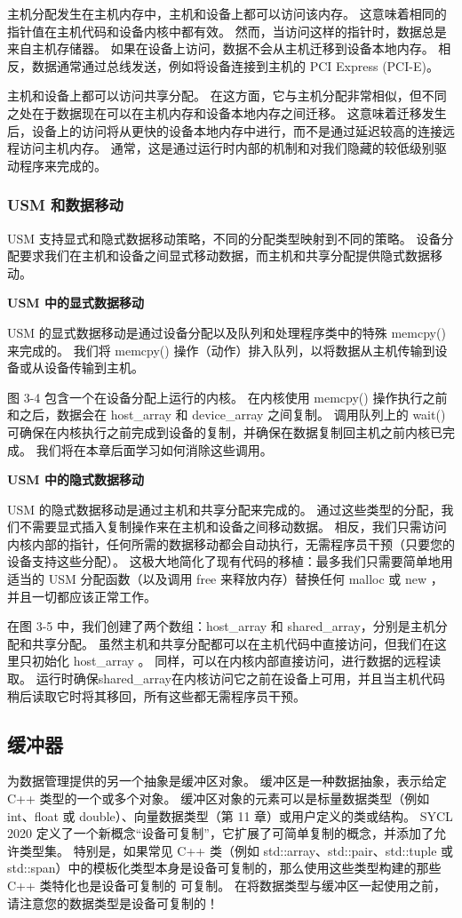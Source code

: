 主机分配发生在主机内存中，主机和设备上都可以访问该内存。 这意味着相同的指针值在主机代码和设备内核中都有效。 然而，当访问这样的指针时，数据总是来自主机存储器。 如果在设备上访问，数据不会从主机迁移到设备本地内存。 相反，数据通常通过总线发送，例如将设备连接到主机的 PCI Express (PCI-E)。

主机和设备上都可以访问共享分配。 在这方面，它与主机分配非常相似，但不同之处在于数据现在可以在主机内存和设备本地内存之间迁移。 这意味着迁移发生后，设备上的访问将从更快的设备本地内存中进行，而不是通过延迟较高的连接远程访问主机内存。 通常，这是通过运行时内部的机制和对我们隐藏的较低级别驱动程序来完成的。

\subsubsection{USM 和数据移动}
USM 支持显式和隐式数据移动策略，不同的分配类型映射到不同的策略。 设备分配要求我们在主机和设备之间显式移动数据，而主机和共享分配提供隐式数据移动。

\textbf{USM 中的显式数据移动}

USM 的显式数据移动是通过设备分配以及队列和处理程序类中的特殊 memcpy() 来完成的。 我们将 memcpy() 操作（动作）排入队列，以将数据从主机传输到设备或从设备传输到主机。

图 3-4 包含一个在设备分配上运行的内核。 在内核使用 memcpy() 操作执行之前和之后，数据会在 host\_array 和 device\_array 之间复制。 调用队列上的 wait() 可确保在内核执行之前完成到设备的复制，并确保在数据复制回主机之前内核已完成。 我们将在本章后面学习如何消除这些调用。

\textbf{USM 中的隐式数据移动}

USM 的隐式数据移动是通过主机和共享分配来完成的。 通过这些类型的分配，我们不需要显式插入复制操作来在主机和设备之间移动数据。 相反，我们只需访问内核内部的指针，任何所需的数据移动都会自动执行，无需程序员干预（只要您的设备支持这些分配）。 这极大地简化了现有代码的移植：最多我们只需要简单地用适当的 USM 分配函数（以及调用 free 来释放内存）替换任何 malloc 或 new ，并且一切都应该正常工作。

在图 3-5 中，我们创建了两个数组：host\_array 和 shared\_array，分别是主机分配和共享分配。 虽然主机和共享分配都可以在主机代码中直接访问，但我们在这里只初始化 host\_array 。 同样，可以在内核内部直接访问，进行数据的远程读取。 运行时确保shared\_array在内核访问它之前在设备上可用，并且当主机代码稍后读取它时将其移回，所有这些都无需程序员干预。

\subsection{缓冲器}
为数据管理提供的另一个抽象是缓冲区对象。 缓冲区是一种数据抽象，表示给定 C++ 类型的一个或多个对象。 缓冲区对象的元素可以是标量数据类型（例如 int、float 或 double）、向量数据类型（第 11 章）或用户定义的类或结构。 SYCL 2020 定义了一个新概念“设备可复制”，它扩展了可简单复制的概念，并添加了允许类型集。 特别是，如果常见 C++ 类（例如 std::array、std::pair、std::tuple 或 std::span）中的模板化类型本身是设备可复制的，那么使用这些类型构建的那些 C++ 类特化也是设备可复制的 可复制。 在将数据类型与缓冲区一起使用之前，请注意您的数据类型是设备可复制的！

